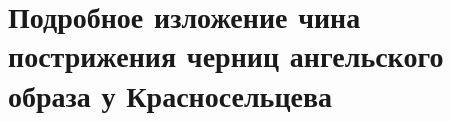 \chapter{Подробное изложение чина пострижения черниц ангельского образа у Красносельцева}
\label{cha:appendix2}

